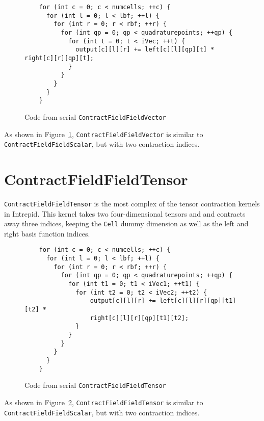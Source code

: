 \begin{figure}[ht]
    \begin{lstlisting}
    for (int c = 0; c < numcells; ++c) {
      for (int l = 0; l < lbf; ++l) {
        for (int r = 0; r < rbf; ++r) {
          for (int qp = 0; qp < quadraturepoints; ++qp) {
            for (int t = 0; t < iVec; ++t) {
              output[c][l][r] += left[c][l][qp][t] * right[c][r][qp][t];
            }
          }
        }
      }
    }
    \end{lstlisting}
\caption{Code from serial \texttt{ContractFieldFieldVector}
\label{lst:ContractFieldFieldVectorSerial}} 
\end{figure}

As shown in Figure~\ref{lst:ContractFieldFieldVectorSerial},
\texttt{ContractFieldFieldVector} is similar to
\texttt{ContractFieldFieldScalar}, but with two contraction indices.

\section{ContractFieldFieldTensor}
\texttt{ContractFieldFieldTensor} is the most complex of the tensor contraction
kernels in Intrepid.  This kernel takes two four-dimensional tensors and
and contracts away three indices, keeping the \texttt{Cell} dummy dimension as
well as the left and right basis function indices.

\begin{figure}[ht]
    \begin{lstlisting}
    for (int c = 0; c < numcells; ++c) {
      for (int l = 0; l < lbf; ++l) {
        for (int r = 0; r < rbf; ++r) {
          for (int qp = 0; qp < quadraturepoints; ++qp) {
            for (int t1 = 0; t1 < iVec1; ++t1) {
              for (int t2 = 0; t2 < iVec2; ++t2) {
                  output[c][l][r] += left[c][l][r][qp][t1][t2] *
                  right[c][l][r][qp][t1][t2];
              }
            }
          }
        }
      }
    }
    \end{lstlisting}
\caption{Code from serial \texttt{ContractFieldFieldTensor}
\label{lst:ContractFieldFieldTensorSerial}} 
\end{figure}

As shown in Figure~\ref{lst:ContractFieldFieldTensorSerial},
\texttt{ContractFieldFieldTensor} is similar to
\texttt{ContractFieldFieldScalar}, but with two contraction indices.

